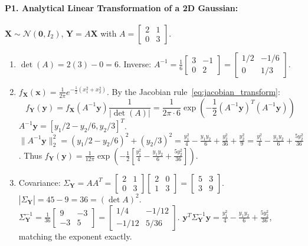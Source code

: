 \paragraph{P1. Analytical Linear Transformation of a 2D Gaussian:}
$\mathbf{X} \sim \mathcal{N}(\mathbf{0}, I_2)$, $\mathbf{Y} = A\mathbf{X}$ with $A = \begin{bmatrix} 2 & 1 \\ 0 & 3 \end{bmatrix}$.
\begin{enumerate}[label=(\alph*)]
    \item $\det(A) = 2(3) - 0 = 6$.
    Inverse: $A^{-1} = \frac{1}{6}\begin{bmatrix} 3 & -1 \\ 0 & 2 \end{bmatrix} = \begin{bmatrix} 1/2 & -1/6 \\ 0 & 1/3 \end{bmatrix}$.
    \item $f_{\mathbf{X}}(\mathbf{x}) = \frac{1}{2\pi} e^{-\frac{1}{2}(x_1^2 + x_2^2)}$. By the Jacobian rule~\eqref{eq:jacobian_transform}:
    \begin{equation*}
    f_{\mathbf{Y}}(\mathbf{y}) = f_{\mathbf{X}}(A^{-1}\mathbf{y})\frac{1}{|\det(A)|} = \frac{1}{2\pi \cdot 6} \exp\left( -\frac{1}{2} (A^{-1}\mathbf{y})^T (A^{-1}\mathbf{y}) \right)
    \end{equation*}
    $A^{-1}\mathbf{y} = [y_1/2 - y_2/6, y_2/3]^T$.
    $\|A^{-1}\mathbf{y}\|_2^2 = (y_1/2 - y_2/6)^2 + (y_2/3)^2 = \frac{y_1^2}{4} - \frac{y_1 y_2}{6} + \frac{y_2^2}{36} + \frac{y_2^2}{9} = \frac{y_1^2}{4} - \frac{y_1 y_2}{6} + \frac{5y_2^2}{36}$.
    Thus $f_{\mathbf{Y}}(\mathbf{y}) = \frac{1}{12\pi} \exp\left( -\frac{1}{2} \left[ \frac{y_1^2}{4} - \frac{y_1 y_2}{6} + \frac{5y_2^2}{36} \right] \right)$.
    \item Covariance: $\Sigma_{\mathbf{Y}} = A A^T = \begin{bmatrix} 2 & 1 \\ 0 & 3 \end{bmatrix}\begin{bmatrix} 2 & 0 \\ 1 & 3 \end{bmatrix} = \begin{bmatrix} 5 & 3 \\ 3 & 9 \end{bmatrix}$.
    $|\Sigma_{\mathbf{Y}}| = 45 - 9 = 36 = (\det A)^2$.
    $\Sigma_{\mathbf{Y}}^{-1} = \frac{1}{36}\begin{bmatrix} 9 & -3 \\ -3 & 5 \end{bmatrix} = \begin{bmatrix} 1/4 & -1/12 \\ -1/12 & 5/36 \end{bmatrix}$.
    $\mathbf{y}^T \Sigma_{\mathbf{Y}}^{-1}\mathbf{y} = \frac{y_1^2}{4} - \frac{y_1 y_2}{6} + \frac{5y_2^2}{36}$, matching the exponent exactly.
\end{enumerate}


